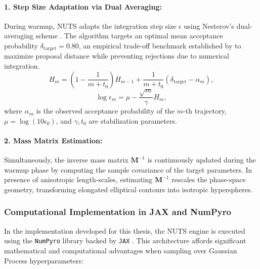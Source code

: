 \documentclass[12pt,oneside]{report}
\theoremstyle{definition}
\theoremstyle{remark}
\begin{document}
\paragraph{1. Step Size Adaptation via Dual Averaging:} 
During warmup, NUTS adapts the integration step size $\epsilon$ using Nesterov's dual-averaging scheme \cite{nesterov2009primal, hoffman2014nuts}. The algorithm targets an optimal mean acceptance probability $\delta_{\text{target}} = 0.80$, an empirical trade-off benchmark established by \citet{hoffman2014nuts} to maximize proposal distance while preventing rejections due to numerical integration.
\begin{equation}
    H_m = \left(1 - \frac{1}{m + t_0}\right) H_{m-1} + \frac{1}{m + t_0} \left(\delta_{\text{target}} - \alpha_m\right),
\end{equation}
\begin{equation}
    \log \epsilon_m = \mu - \frac{\sqrt{m}}{\gamma} H_m,
\end{equation}
where $\alpha_m$ is the observed acceptance probability of the $m$-th trajectory, $\mu = \log(10 \epsilon_0)$, and $\gamma, t_0$ are stabilization parameters.

\paragraph{2. Mass Matrix Estimation:}
Simultaneously, the inverse mass matrix $\mathbf{M}^{-1}$ is continuously updated during the warmup phase by computing the sample covariance of the target parameters. In presence of anisotropic length-scales, estimating $\mathbf{M}^{-1}$ rescales the phase-space geometry, transforming elongated elliptical contours into isotropic hyperspheres.

\subsubsection{Computational Implementation in JAX and NumPyro}

In the implementation developed for this thesis, the NUTS engine is executed using the \texttt{NumPyro} library \cite{phan2019numpyro} backed by \texttt{JAX} \cite{jax2018github}. This architecture affords significant mathematical and computational advantages when sampling over Gaussian Process hyperparameters:
\end{document}

